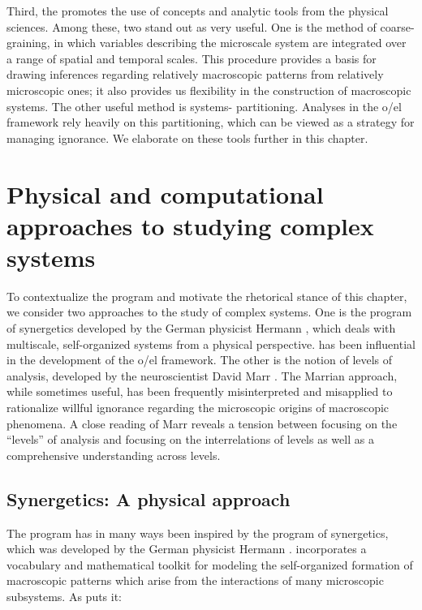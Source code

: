   Third, the  promotes the use of concepts and analytic tools from the physical sciences. Among these, two stand out as very useful. One is the method of coarse-graining, in which variables describing the microscale system are integrated over a range of spatial and temporal scales. This procedure provides a basis for drawing inferences regarding relatively macroscopic patterns from relatively microscopic ones; it also provides us flexibility in the construction of macroscopic systems. The other useful method is systems- partitioning. Analyses in the o/el framework rely heavily on this partitioning, which can be viewed as a strategy for managing ignorance. We elaborate on these tools further in this chapter.

\section{Physical and computational approaches to studying complex systems}

To contextualize the  program and motivate the rhetorical stance of this chapter, we consider two approaches to the study of complex systems. One is the program of synergetics developed by the German physicist Hermann  \citep{Haken1973,Haken1983b,Haken1983a}, which deals with multiscale, self-organized systems from a physical perspective.  has been influential in the development of the o/el framework. The other is the notion of levels of analysis, developed by the neuroscientist David Marr \citep{MarrPoggio1977,Marr1982}. The Marrian approach, while sometimes useful, has been frequently misinterpreted and misapplied to rationalize willful ignorance regarding the microscopic origins of macroscopic phenomena. A close reading of Marr reveals a tension between focusing on the “levels” of analysis and focusing on the interrelations of levels as well as a comprehensive understanding across levels.

\subsection{Synergetics: A physical approach}

The  program has in many ways been inspired by the program of synergetics, which was developed by the German physicist Hermann  \citep{Haken1973,Haken1983b,Haken1983a}.  incorporates a vocabulary and mathematical toolkit for modeling the self-organized formation of macroscopic patterns which arise from the interactions of many microscopic subsystems. As \citet{Haken1973} puts it:


